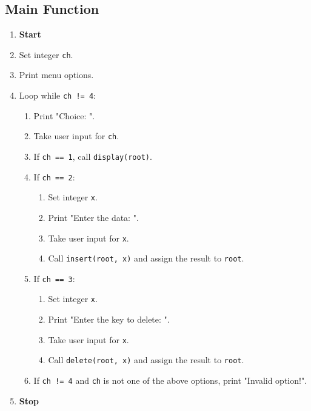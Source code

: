 {  \subsection{Main Function}
  \begin{enumerate}[label=\arabic*:,left=0pt]
    \item \textbf{Start}
    \item Set integer \texttt{ch}.
    \item Print menu options.
    \item Loop while \texttt{ch != 4}:
          \begin{enumerate}[label=4.\arabic*:, start=1]
            \item Print "Choice: ".
            \item Take user input for \texttt{ch}.
            \item If \texttt{ch == 1}, call \texttt{display(root)}.
            \item If \texttt{ch == 2}:
                  \begin{enumerate}[label=4.4.\arabic*:, start=1]
                    \item Set integer \texttt{x}.
                    \item Print "Enter the data: ".
                    \item Take user input for \texttt{x}.
                    \item Call \texttt{insert(root, x)} and assign the result to \texttt{root}.
                  \end{enumerate}
            \item If \texttt{ch == 3}:
                  \begin{enumerate}[label=4.5.\arabic*:, start=1]
                    \item Set integer \texttt{x}.
                    \item Print "Enter the key to delete: ".
                    \item Take user input for \texttt{x}.
                    \item Call \texttt{delete(root, x)} and assign the result to \texttt{root}.
                  \end{enumerate}
            \item If \texttt{ch != 4} and \texttt{ch} is not one of the above options, print "Invalid option!".
          \end{enumerate}
    \item \textbf{Stop}
  \end{enumerate}

 }

